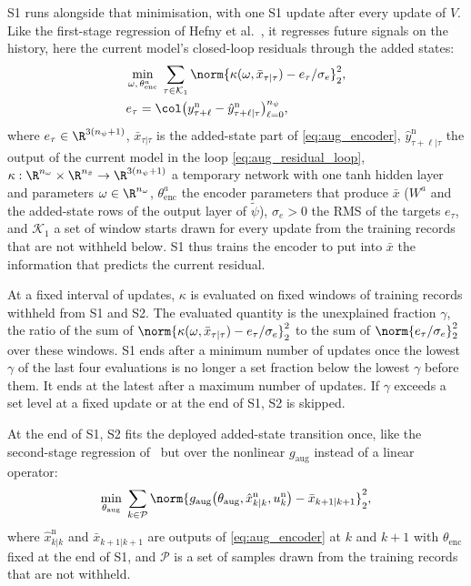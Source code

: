 S1 runs alongside that minimisation, with one S1 update after every update of
$V$.
Like the first-stage regression of Hefny et
al.~\cite[Sec.~3]{hefny2015supervised}, it regresses future signals on the
history, here the current model's closed-loop residuals through the added
states:
\begin{equation}
\begin{aligned}
 &\min_{\omega,\,\theta^a_{\mathrm{enc}}}\;
 \sum_{\tau\in\mathcal K_1}
 \norm{\kappa(\omega,\bar x_{\tau|\tau})-e_\tau/\sigma_e}_2^2,\\
 &e_\tau=\col\bigl(y^{\mathrm n}_{\tau+\ell}
 -\hat y^{\mathrm n}_{\tau+\ell|\tau}\bigr)_{\ell=0}^{n_\psi},
\end{aligned}
\label{eq:ps2_s1}
\end{equation}
where $e_\tau\in\R^{3(n_\psi+1)}$, $\bar x_{\tau|\tau}$ is the added-state part
of \eqref{eq:aug_encoder},
$\hat y^{\mathrm n}_{\tau+\ell|\tau}$ the output of the current model in the
loop \eqref{eq:aug_residual_loop},
$\kappa:\R^{n_\omega}\times\R^{n_{\bar x}}\to\R^{3(n_\psi+1)}$ a temporary
network with one tanh hidden layer and parameters $\omega\in\R^{n_\omega}$,
$\theta^a_{\mathrm{enc}}$ the encoder parameters that produce $\bar x$ ($W^a$
and the added-state rows of the output layer of $\tilde\psi$), $\sigma_e>0$
the RMS of the targets $e_\tau$, and $\mathcal K_1$ a set of window starts
drawn for every update from the training records that are not withheld below.
S1 thus trains the encoder to put into $\bar x$ the information that predicts
the current residual.

At a fixed interval of updates, $\kappa$ is evaluated on fixed windows of
training records withheld from S1 and S2.
The evaluated quantity is the unexplained fraction $\gamma$, the ratio of the
sum of $\norm{\kappa(\omega,\bar x_{\tau|\tau})-e_\tau/\sigma_e}_2^2$ to the
sum of $\norm{e_\tau/\sigma_e}_2^2$ over these windows.
S1 ends after a minimum number of updates once the lowest $\gamma$ of the last
four evaluations is no longer a set fraction below the lowest $\gamma$ before
them.
It ends at the latest after a maximum number of updates.
If $\gamma$ exceeds a set level at a fixed update or at the end of S1, S2 is
skipped.

At the end of S1, S2 fits the deployed added-state transition once, like the
second-stage regression of~\cite[Sec.~3]{hefny2015supervised} but over the
nonlinear $g_{\mathrm{aug}}$ instead of a linear operator:
\begin{equation}
 \min_{\theta_{\mathrm{aug}}}\;
 \sum_{k\in\mathcal P}
 \norm{g_{\mathrm{aug}}\bigl(\theta_{\mathrm{aug}},\hat x^{\mathrm n}_{k|k},u^{\mathrm n}_k\bigr)
 -\bar x_{k+1|k+1}}_2^2,
 \label{eq:ps2_s2}
\end{equation}
where $\hat x^{\mathrm n}_{k|k}$ and $\bar x_{k+1|k+1}$ are outputs of
\eqref{eq:aug_encoder} at $k$ and $k+1$ with $\theta_{\mathrm{enc}}$ fixed at
the end of S1, and $\mathcal P$ is a set of samples drawn from the training
records that are not withheld.

